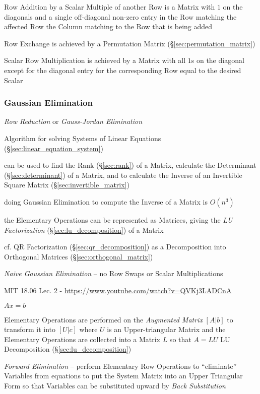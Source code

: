 Row Addition by a Scalar Multiple of another Row is a Matrix with $1$ on the
diagonals and a single off-diagonal non-zero entry in the Row matching the
affected Row the Column matching to the Row that is being added

Row Exchange is achieved by a Permutation Matrix
(\S\ref{sec:permutation_matrix})

Scalar Row Multiplication is achieved by a Matrix with all $1$s on the diagonal
except for the diagonal entry for the corresponding Row equal to the desired
Scalar



\subsubsection{Gaussian Elimination}\label{sec:gaussian_elimination}

\emph{Row Reduction} or \emph{Gauss-Jordan Elimination}

Algorithm for solving Systems of Linear Equations
(\S\ref{sec:linear_equation_system})

can be used to find the Rank (\S\ref{sec:rank}) of a Matrix, calculate the
Determinant (\S\ref{sec:determinant}) of a Matrix, and to calculate the Inverse
of an Invertible Square Matrix (\S\ref{sec:invertible_matrix})

doing Gaussian Elimination to compute the Inverse of a Matrix is $O(n^3)$

the Elementary Operations can be represented as Matrices, giving the \emph{LU
  Factorization} (\S\ref{sec:lu_decomposition}) of a Matrix

cf. QR Factorization (\S\ref{sec:qr_decomposition}) as a Decomposition into
Orthogonal Matrices (\S\ref{sec:orthogonal_matrix})

\emph{Naive Gaussian Elimination} -- no Row Swaps or Scalar Multiplications

\asterism

MIT 18.06 Lec. 2 - \url{https://www.youtube.com/watch?v=QVKj3LADCnA}

$Ax = b$

Elementary Operations are performed on the \emph{Augmented Matrix} $[A | b]$ to
transform it into $[U | c]$ where $U$ is an Upper-triangular Matrix and the
Elementary Operations are collected into a Matrix $L$ so that $A = LU$ \fist LU
Decomposition (\S\ref{sec:lu_decomposition})

\emph{Forward Elimination} -- perform Elementary Row Operations to
``eliminate'' Variables from equations to put the System Matrix into an Upper
Triangular Form so that Variables can be substituted upward by \emph{Back
  Substitution}


